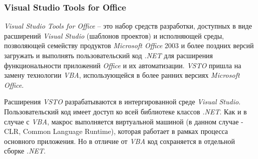 \subsubsection{Visual Studio Tools for Office}

{\it Visual Studio Tools for Office} -- это набор средств разработки, доступных в виде расширений {\it Visual Studio} (шаблонов проектов) и исполняющей среды, позволяющей  семейству продуктов {\it Microsoft Office} 2003 и более поздних версий загружать и выполнять пользовательский код {\it .NET} для расширения функциональности приложений {\it Office} и их автоматизации. {\it VSTO} пришла на замену технологии {\it VBA}, использующейся в более ранних версиях {\it Microsoft Office}. 

Расширения {\it VSTO} разрабатываются в интергированной среде {\it Visual Studio}. Пользовательский код имеет доступ ко всей библиотеке классов {\it .NET}. Как и в случае с {\it VBA}, макрос выполняется виртуальной машиной (в данном случае - CLR, Common Language Runtime), которая работает в рамках процесса основного приложения. Но в отличие от {\it VBA} код сохраняется в отдельной сборке {\it .NET}.
